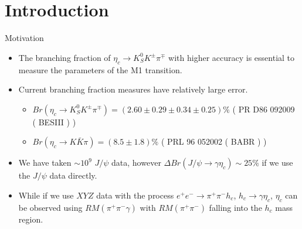 \documentclass{beamer}
\begin{document}
\section{Introduction}
\begin{frame}{Motivation}
    \begin{itemize}
        \item The branching fraction of $\eta_c\to K_S^0 K^{\pm}\pi^{\mp}$ with higher accuracy is essential to measure the parameters of the M1 transition.
        \item Current branching fraction measures have relatively large error.
            \begin{itemize}
                \item \tiny{$Br(\eta_c\to K_S^0 K^{\pm} \pi^{\mp}) = ( 2.60\pm 0.29\pm0.34\pm0.25)\%$ ( PR D86 092009 ( BESIII ) )}
                \item $Br( \eta_c\to K \bar{K}\pi ) = ( 8.5\pm 1.8 )\%$ ( PRL 96 052002 ( BABR ) ) 
            \end{itemize}
        \item We have taken $\sim 10^9$ $J/\psi$ data, however $\Delta Br( J/\psi \to \gamma\eta_c )\sim 25\%$ if we use the $J/\psi$ data directly.
        \item While if we use $XYZ$ data with the process $e^+e^-\to \pi^+\pi^- h_c$, $h_c\to\gamma \eta_c$, $\eta_c$ can be observed using $RM( \pi^+ \pi^- \gamma )$ with $RM(\pi^+\pi^-)$ falling into the $h_c$ mass region.
    \end{itemize}
\end{frame}
\end{document}
